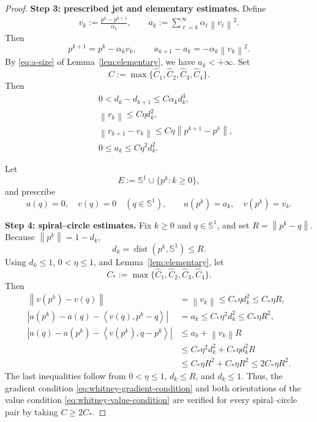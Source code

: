 \documentclass[11pt]{article}
\numberwithin{equation}{section}
\newcommand{\ip}[2]{\left\langle #1,#2\right\rangle}
\newcommand{\norm}[1]{\left\lVert #1\right\rVert}
\newcommand{\Sph}{\mathbb S}
\newcommand{\Sone}{\mathbb S^1}
\newcommand{\dist}{\operatorname{dist}}
\begin{document}
\begin{proof}
\medskip\noindent
\textbf{Step 3: prescribed jet and elementary estimates.}
Define
\begin{eqnarray}\label{vkak}
v_k:=\frac{p^k-p^{k+1}}{\alpha_k},\qquad a_k:=\sum_{\ell=k}^{\infty}\alpha_\ell\norm{v_\ell}^2.
\end{eqnarray}
Then
\[
p^{k+1}=p^k-\alpha_kv_k,\qquad a_{k+1}-a_k=-\alpha_k\norm{v_k}^2.
\]
By \eqref{eq:a-size} of Lemma~\ref{lem:elementary}, we have $a_k<+\infty$.
Set
\[
    C:=\max\{\widehat C_1,\widehat C_2,
             \widehat C_3,\widehat C_4\}.
\]
Then
\begin{eqnarray*}
&&0<d_k-d_{k+1}\leq C\alpha_kd_k^3,\label{eq:d-est}\\
&&\norm{v_k}\leq C\eta d_k^2,\label{eq:v-est}\\
&&\norm{v_{k+1}-v_k}\leq C\eta\norm{p^{k+1}-p^k},\label{eq:vdiff-est}\\
&&0\leq a_k\leq C\eta^2d_k^2.\label{eq:a-est}
\end{eqnarray*}

Let
\[
E:=\Sph^1\cup\{p^k:k\ge0\},
\]
and prescribe
\[
a(q)=0,\quad v(q)=0\quad(q\in\Sph^1),\qquad a(p^k)=a_k,\quad v(p^k)=v_k.
\]

\medskip\noindent
\textbf{Step 4: spiral--circle estimates.}
Fix \(k\geq0\) and \(q\in\Sone\), and set \(R=\norm{p^k-q}\).
Because \(\norm{p^k}=1-d_k\),
\[
   d_k= \dist(p^k,\Sone)\le R.
\]
Using \(d_k\leq1\), \(0<\eta\leq1\), and
Lemma~\ref{lem:elementary}, let
\[
{C_*}:=\max\{\widehat C_1,\widehat C_2,\widehat C_3,\widehat C_4\}.
\]
Then
\begin{align}
    \norm{v(p^k)-v(q)}
    &=
    \norm{v_k}
    \leq C_*\eta d_k^2
    \leq C_*\eta R,
    \label{eq:mixed-gradient}\\
    |a(p^k)-a(q)-\ip{v(q)}{p^k-q}|
    &=
    a_k
    \leq C_*\eta^2d_k^2
    \leq C_*\eta R^2,
    \label{eq:mixed-forward}\\
    |a(q)-a(p^k)-\ip{v(p^k)}{q-p^k}|
    &\leq
    a_k+\norm{v_k}R \nonumber\\
    &\leq
    C_*\eta^2d_k^2+C_*\eta d_k^2R \nonumber\\
    &\leq
    C_*\eta R^2+C_*\eta R^2
    \leq 2 C_*\eta R^2.
    \label{eq:mixed-reverse}
\end{align}
 The last inequalities follow from
\(0<\eta\leq1\), \(d_k\leq R\), and \(d_k\leq1\). Thus, the gradient condition \eqref{eq:whitney-gradient-condition} and both
orientations of the value condition \eqref{eq:whitney-value-condition} are
verified for every spiral--circle pair by taking $C\geq 2C_*.$



\end{proof}
\end{document}
